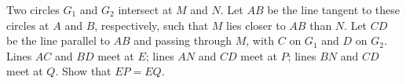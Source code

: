 Two circles $G_1$ and $G_2$ intersect at $M$ and $N$. Let $AB$ be the line tangent to these circles at $A$ and $B$, respectively, such that $M$ lies closer to $AB$ than $N$. Let $CD$ be the line parallel to $AB$ and passing through $M$, with $C$ on $G_1$ and $D$ on $G_2$. Lines $AC$ and $BD$ meet at $E$; lines $AN$ and $CD$ meet at $P$; lines $BN$ and $CD$ meet at $Q$. Show that $EP = EQ$.
